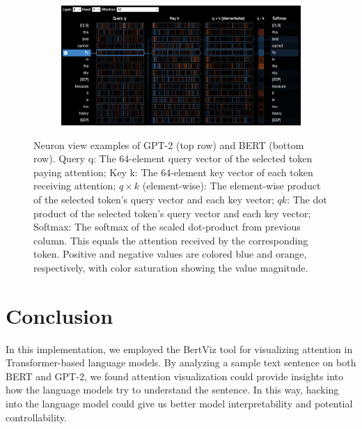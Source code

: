 \documentclass[]{article}
\begin{document}
\begin{figure}[!h]
\begin{subfigure}[b]{0.48\textwidth}
    \end{subfigure} 
    \hfill
    \begin{subfigure}[b]{0.48\textwidth}
        \includegraphics[width=\textwidth]{FIGS/bert_neuron_L0H6_fly.png}
    \end{subfigure}
    \caption{Neuron view examples of GPT-2 (top row) and BERT (bottom row). Query q: The 64-element query vector of the selected token paying attention; 
    Key k: The 64-element key vector of each token receiving attention;
    $q\times k$ (element-wise): The element-wise product of the selected token's query vector and each key vector;
    $q\dot k$: The dot product of the selected token's query vector and each key vector;
    Softmax: The softmax of the scaled dot-product from previous column. This equals the attention received by the corresponding token.
    Positive and negative values are colored blue and orange, respectively, with color saturation showing the value magnitude.}
    \label{fig:neuron}
\end{figure}


\section{Conclusion}
In this implementation, we employed the BertViz tool for visualizing attention in Transformer-based language models. By analyzing a sample text sentence on both BERT and GPT-2, we found attention visualization could provide insights into how the language models try to understand the sentence. 
In this way, hacking into the language model could give us better model interpretability and potential controllability. 


\vspace{-0.2cm}
\scriptsize{


}
\end{document}
